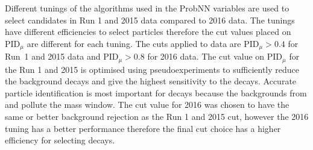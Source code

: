 Different tunings of the algorithms used in the ProbNN variables are used to select candidates in Run 1 and 2015 data compared to 2016 data. The tunings have different efficiencies to select particles therefore the cut values placed on PID$_{\mu}$ are different for each tuning. The cuts applied to data are $\text{PID}_{\mu} > 0.4$ for Run~1 and 2015 data and $\text{PID}_{\mu} > 0.8$ for 2016 data. 
The cut value on PID$_{\mu}$ for the Run 1 and 2015 is optimised using pseudoexperiments to sufficiently reduce the background decays and give the highest sensitivity to the \bdmumu decays. Accurate particle identification is most important for \bdmumu decays because the backgrounds from \bhh and \lambdab pollute the \bd mass window. The cut value for 2016 was chosen to have the same or better background rejection as the Run 1 and 2015 cut, however the 2016 tuning has a better performance therefore the final cut choice has a higher efficiency for selecting \bmumu decays. 





